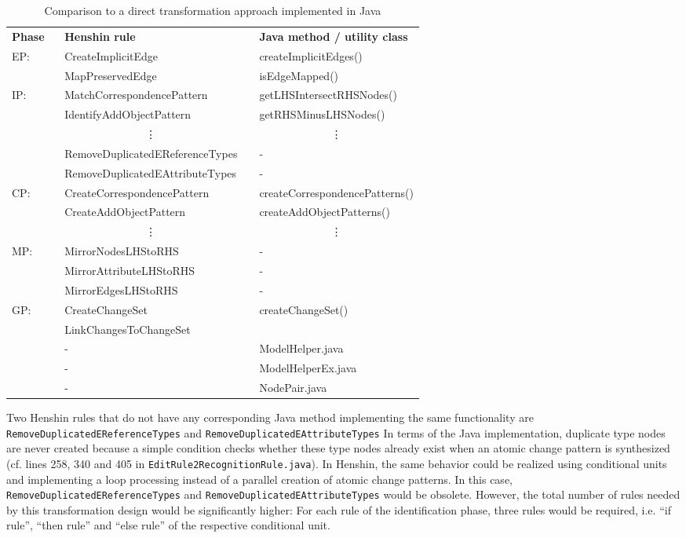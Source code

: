 \documentclass{llncs}
\begin{document}
\begin{table}[htb]
\centering
\caption{Comparison to a direct transformation approach implemented in Java}

\begin{tabular}{llcl}
\toprule
\textbf{Phase} \ & \textbf{Henshin rule}  & & \textbf{Java method / utility class} \\
\cmidrule{1-4}
EP: & CreateImplicitEdge & & createImplicitEdges() \\
& MapPreservedEdge & & isEdgeMapped() \\

IP: & MatchCorrespondencePattern & & getLHSIntersectRHSNodes() \\
& IdentifyAddObjectPattern & & getRHSMinusLHSNodes() \\
& \multicolumn{1}{c}{\vdots} & & \multicolumn{1}{c}{\vdots} \\
& RemoveDuplicatedEReferenceTypes & & -  \\
& RemoveDuplicatedEAttributeTypes & & -  \\

CP: & CreateCorrespondencePattern & & createCorrespondencePatterns()  \\
& CreateAddObjectPattern & & createAddObjectPatterns()  \\
& \multicolumn{1}{c}{\vdots} & & \multicolumn{1}{c}{\vdots} \\

MP: & MirrorNodesLHStoRHS & & - \\
& MirrorAttributeLHStoRHS & & - \\
& MirrorEdgesLHStoRHS & & - \\

GP: & CreateChangeSet & & \multirow{2}{*}{createChangeSet()} \\
& LinkChangesToChangeSet & & \\
\cmidrule{2-4}
& - & & ModelHelper.java \\
& - & & ModelHelperEx.java \\
& - & & NodePair.java \\
\bottomrule
\end{tabular}
  \label{tab:java-comparison}
\end{table}

Two Henshin rules that do not have any corresponding Java method 
implementing the same functionality are 
\texttt{RemoveDuplicatedEReferenceTypes} and \texttt{RemoveDuplicatedEAttributeTypes} 
In terms of the Java implementation, duplicate type nodes are never created
because a simple condition checks whether these type nodes 
already exist when an atomic change pattern is synthesized
(cf. lines 258, 340 and 405 in \texttt{EditRule2RecognitionRule.java}).
In Henshin, the same behavior could be realized 
using conditional units and implementing a loop processing instead of a 
parallel creation of atomic change patterns. In this case,
\texttt{RemoveDuplicatedEReferenceTypes} and \texttt{RemoveDuplicatedEAttributeTypes} 
would be obsolete. However, the total number of rules needed by 
this transformation design would be significantly
higher: For each rule of the identification phase, three
rules would be required, i.e. ``if rule'', ``then rule'' and
``else rule'' of the respective conditional unit.
\end{document}
